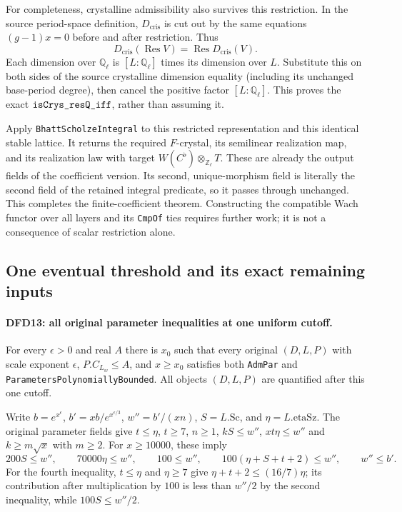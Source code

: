 For completeness, crystalline admissibility also survives
this restriction. In the source period-space definition,
$D_{\mathrm{cris}}$ is cut out by the same equations
$(g-1)x=0$ before and after restriction. Thus
\[
 D_{\mathrm{cris}}(\operatorname{Res}V)
   =\operatorname{Res}D_{\mathrm{cris}}(V).              \tag{DFD.19}
\]
Each dimension over $\mathbb Q_\ell$ is
$[L:\mathbb Q_\ell]$ times its dimension over $L$.
Substitute this on both sides of the source crystalline
dimension equality (including its unchanged base-period
degree), then cancel the positive factor
$[L:\mathbb Q_\ell]$. This proves the exact
$\texttt{is\allowbreak Crys\_\allowbreak res\allowbreak Q\_\allowbreak iff}$, rather than assuming it.

Apply \texttt{Bhatt\allowbreak Scholze\allowbreak Integral} to this restricted
representation and this identical stable lattice. It
returns the required $F$-crystal, its semilinear realization
map, and its realization law with target
$W(C^\flat)\otimes_{\mathbb Z_\ell}T$. These are already
the output fields of the coefficient version. Its second,
unique-morphism field is literally the second field of
the retained integral predicate, so it passes through
unchanged. This completes the finite-coefficient theorem.
Constructing the compatible Wach functor over all layers
and its \texttt{Cmp\allowbreak Of} ties requires further work; it is
not a consequence of scalar restriction alone.

\subsection{One eventual threshold and its exact remaining inputs}

\paragraph{DFD13: all original parameter inequalities at one uniform cutoff.}
\label{claim:DFD13}
For every $\epsilon>0$ and real $A$ there is $x_0$ such
that every original $(D,L,P)$ with scale exponent
$\epsilon$, $P.C_{L_w}\le A$, and $x\ge x_0$ satisfies
both \texttt{Adm\allowbreak Par} and
\texttt{Parameters\allowbreak Polynomially\allowbreak Bounded}. All objects
$(D,L,P)$ are quantified after this one cutoff.

Write $b=e^{x^\epsilon}$,
$b'=xb/e^{x^{\epsilon/3}}$,
$w''=b'/(xn)$, $S=L.\mathrm{Sc}$, and
$\eta=L.\mathrm{etaSz}$. The original parameter fields
give $t\le\eta$, $t\ge7$, $n\ge1$,
$kS\le w''$, $xt\eta\le w''$ and
$k\ge m\sqrt{x}$ with $m\ge2$.
For $x\ge10000$, these imply
\[
 200S\le w'',\qquad70000\eta\le w'',\qquad
 100\le w'',\qquad100(\eta+S+t+2)\le w'',
 \qquad w''\le b'.                                    \tag{DFD.20}
\]
For the fourth inequality, $t\le\eta$ and $\eta\ge7$
give $\eta+t+2\le(16/7)\eta$; its contribution after
multiplication by $100$ is less than $w''/2$ by the
second inequality, while $100S\le w''/2$.

